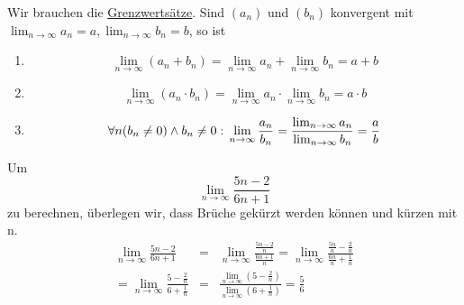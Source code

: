 \documentclass{report}
\begin{document}
Wir brauchen die \underline{Grenzwertsätze}. Sind $(a_n)$ und $(b_n)$ konvergent mit $\lim_{n \to \infty}a_n = a, \lim_{n \to \infty}b_n = b$, so ist
\begin{enumerate}
\item \begin{equation}\lim_{n \to \infty}(a_n + b_n) = \lim_{n \to \infty}a_n + \lim_{n \to \infty}b_n = a + b\end{equation}
\item \begin{equation}\lim_{n \to \infty}(a_n \cdot b_n) = \lim_{n \to \infty}a_n \cdot \lim_{n \to \infty}b_n = a \cdot b\end{equation}
\item \begin{equation}\forall n (b_n \neq 0) \land b_n \neq 0 :\\
\lim_{n \to \infty}\frac{a_n}{b_n} = \frac{\lim_{n \to \infty}a_n}{\lim_{n \to \infty}b_n} = \frac{a}{b}\end{equation}
\end{enumerate}
Um
\begin{equation}\lim_{n \to \infty}\frac{5n-2}{6n+1}\end{equation}
zu berechnen, überlegen wir, dass Brüche gekürzt werden können und kürzen mit n.
\begin{eqnarray}\lim_{n \to \infty}\frac{5n-2}{6n+1} & = & \lim_{n \to \infty}\frac{\frac{5n-2}{n}}{\frac{6n+1}{n}} = \lim_{n \to \infty}\frac{\frac{5n}{n}-\frac{2}{n}}{\frac{6n}{n}+\frac{1}{n}} \nonumber \\
= \lim_{n \to \infty}\frac{5-\frac{2}{n}}{6+\frac{1}{n}} & =  &\frac{\lim_{n \to \infty}(5-\frac{2}{n})}{\lim_{n \to \infty}(6+\frac{1}{n})} = \frac{5}{6}\end{eqnarray}
\end{document}
